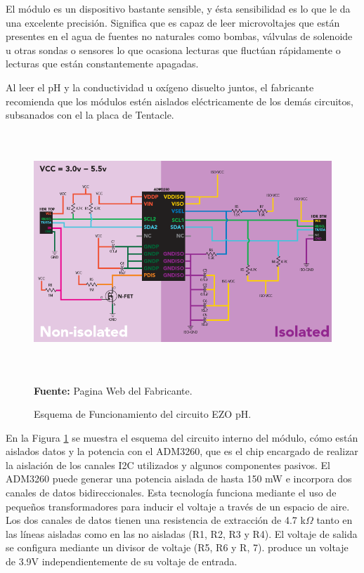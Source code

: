 El módulo es un dispositivo bastante sensible, y ésta sensibilidad es lo que le da una excelente precisión. Significa que es capaz de leer microvoltajes que están presentes en el agua de fuentes no naturales como bombas, válvulas de solenoide u otras sondas o sensores lo que ocasiona lecturas que fluctúan rápidamente o lecturas que están constantemente apagadas.

Al leer el pH y la conductividad u oxígeno disuelto juntos, el fabricante recomienda que los módulos estén aislados eléctricamente de los demás circuitos, subsanados con el la placa de Tentacle.
\newline
\hfill
\begin{figure}[ht]
    \centering
    \includegraphics[width=150mm, height=90mm]{Imagenes/2021/imag36.png}
    \caption[Esquema de Funcionamiento del circuito EZO pH]{Esquema de Funcionamiento del circuito EZO pH.}{\textbf{Fuente: }Pagina Web del Fabricante\cite{ezoph}.}
    \label{fig:4.10}
\end{figure}
En la Figura \ref{fig:4.10} se muestra  el esquema del circuito interno del módulo, cómo están aislados datos y la potencia con el ADM3260, que es el chip encargado de realizar la aislación de los canales I2C utilizados y algunos componentes pasivos. El ADM3260 puede generar una potencia aislada de hasta 150 mW e incorpora dos canales de datos bidireccionales.
Esta tecnología funciona mediante el uso de pequeños transformadores para inducir el voltaje a través de un espacio de aire. Los dos canales de datos tienen una resistencia de extracción de 4.7 k$\Omega$ tanto en las líneas aisladas como en las no aisladas (R1, R2, R3 y R4). El voltaje de salida se configura mediante un divisor de voltaje (R5, R6 y R, 7). produce un voltaje de 3.9V independientemente de su voltaje de entrada.

